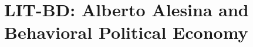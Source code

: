 \section{LIT-BD: Alberto Alesina and Behavioral Political Economy}
\label{app:lit-bd}

%
%
%
%
%
%


